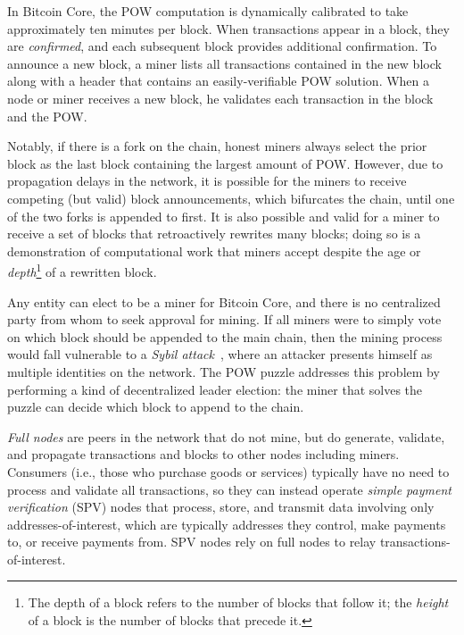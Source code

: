 In Bitcoin Core, the POW computation is dynamically calibrated to take
approximately ten minutes per block. When transactions appear in a
block, they are \emph{confirmed}, and each subsequent block
provides additional confirmation. To announce a new block, a miner
lists all transactions contained in the new block along with a header
that contains an easily-verifiable POW solution. When a node or
miner receives a new block, he validates each transaction in the block
and the POW.

Notably, if there is a fork on the chain, honest miners always select the prior block as the last block containing the largest amount of POW. However, due to propagation delays in the network, it is possible for the
miners to receive competing (but valid) block announcements, which
bifurcates the chain, until one of the two forks is appended to
first. It is also possible and valid for a miner to receive a set of
blocks that retroactively rewrites many blocks; doing so is a
demonstration of computational work that miners accept despite the age
or \emph{depth}\footnote{The depth of a block refers to the number of blocks that follow it; the \emph{height} of a block is the number of
blocks that precede it.} of a rewritten block.


Any entity can elect to be a miner for Bitcoin Core, and there is no
centralized party from whom to seek approval for mining. If all miners
were to simply vote on which block should be appended to the main chain, then the mining process would fall vulnerable to a {\em Sybil
attack}~\cite{Douceur:2002}, where an attacker presents himself as multiple identities on the network. The POW puzzle addresses this
problem by performing a kind of decentralized leader election: the
miner that solves the puzzle can decide which block to append to the
chain.

 {\em Full nodes} are peers in the network that do not mine, but do
generate, validate, and propagate transactions and blocks to other
nodes including miners. Consumers (i.e., those who purchase goods or
services) typically have no need to process and validate all
transactions, so they can instead operate \emph{simple payment
  verification} (SPV) nodes that process, store, and transmit data
involving only addresses-of-interest, which are typically addresses
they control, make payments to, or receive payments from. SPV nodes
rely on full nodes to relay transactions-of-interest.

